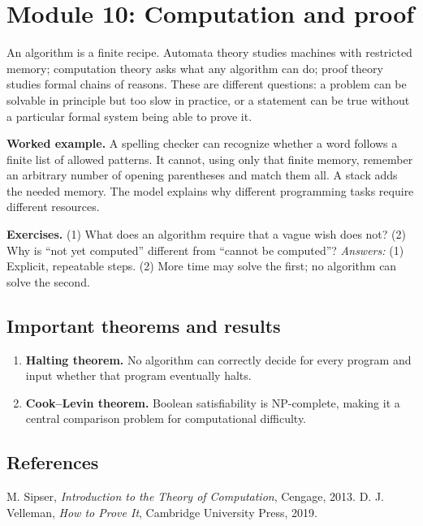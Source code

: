 \documentclass[11pt,oneside]{book}
\makeatletter
\renewenvironment{thebibliography}[1]
  {\list{\@biblabel{\@arabic\c@enumiv}}%
    {\settowidth\labelwidth{\@biblabel{#1}}%
     \leftmargin\labelwidth
     \advance\leftmargin\labelsep
     \usecounter{enumiv}%
     \let\p@enumiv\@empty
     \renewcommand\theenumiv{\@arabic\c@enumiv}}}
  {\endlist}
\makeatother
\begin{document}
\chapter[Module 10: Computation and proof]{Module 10: Computation and proof}
An algorithm is a finite recipe. Automata theory studies machines with restricted memory; computation theory asks what any algorithm can do; proof theory studies formal chains of reasons. These are different questions: a problem can be solvable in principle but too slow in practice, or a statement can be true without a particular formal system being able to prove it.

\textbf{Worked example.} A spelling checker can recognize whether a word follows a finite list of allowed patterns. It cannot, using only that finite memory, remember an arbitrary number of opening parentheses and match them all. A stack adds the needed memory. The model explains why different programming tasks require different resources.

\textbf{Exercises.} (1) What does an algorithm require that a vague wish does not? (2) Why is ``not yet computed'' different from ``cannot be computed''? \emph{Answers:} (1) Explicit, repeatable steps. (2) More time may solve the first; no algorithm can solve the second.

\section*{Important theorems and results}
\begin{enumerate}[leftmargin=*,itemsep=0.35em]
\item \textbf{Halting theorem.} No algorithm can correctly decide for every program and input whether that program eventually halts.

\item \textbf{Cook--Levin theorem.} Boolean satisfiability is NP-complete, making it a central comparison problem for computational difficulty.
\end{enumerate}

\section*{References}
\begin{thebibliography}{9}
 M. Sipser, \emph{Introduction to the Theory of Computation}, Cengage, 2013.
 D. J. Velleman, \emph{How to Prove It}, Cambridge University Press, 2019.
\end{thebibliography}
\end{document}
